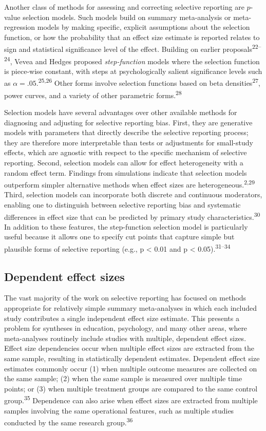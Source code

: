 \documentclass[
  american,
  man, donotrepeattitle,floatsintext]{apa7}
\begin{document}
Another class of methods for assessing and correcting selective reporting are \(p\)-value selection models.
Such models build on summary meta-analysis or meta-regression models by making specific, explicit assumptions about the selection function, or how the probability that an effect size estimate is reported relates to sign and statistical significance level of the effect. Building on earlier proposals\textsuperscript{22--24}, Vevea and Hedges proposed \emph{step-function} models where the selection function is piece-wise constant, with steps at psychologically salient significance levels such as \(\alpha = .05\).\textsuperscript{25,26}
Other forms involve selection functions based on beta densities\textsuperscript{27}, power curves, and a variety of other parametric forms.\textsuperscript{28}

Selection models have several advantages over other available methods for diagnosing and adjusting for selective reporting bias.
First, they are generative models with parameters that directly describe the selective reporting process; they are therefore more interpretable than tests or adjustments for small-study effects, which are agnostic with respect to the specific mechanism of selective reporting.
Second, selection models can allow for effect heterogeneity with a random effect term.
Findings from simulations indicate that selection models outperform simpler alternative methods when effect sizes are heterogeneous.\textsuperscript{2,29}
Third, selection models can incorporate both discrete and continuous moderators, enabling one to distinguish between selective reporting bias and systematic differences in effect size that can be predicted by primary study characteristics.\textsuperscript{30}
In addition to these features, the step-function selection model is particularly useful because it allows one to specify cut points that capture simple but plausible forms of selective reporting (e.g., p \textless{} 0.01 and p \textless{} 0.05).\textsuperscript{31--34}

\subsection{Dependent effect sizes}\label{dependent-effect-sizes}

The vast majority of the work on selective reporting has focused on methods appropriate for relatively simple summary meta-analyses in which each included study contributes a single independent effect size estimate.
This presents a problem for syntheses in education, psychology, and many other areas, where meta-analyses routinely include studies with multiple, dependent effect sizes.
Effect size dependencies occur when multiple effect sizes are extracted from the same sample, resulting in statistically dependent estimates.
Dependent effect size estimates commonly occur (1) when multiple outcome measures are collected on the same sample; (2) when the same sample is measured over multiple time points; or (3) when multiple treatment groups are compared to the same control group.\textsuperscript{35}
Dependence can also arise when effect sizes are extracted from multiple samples involving the same operational features, such as multiple studies conducted by the same research group.\textsuperscript{36}
\end{document}
